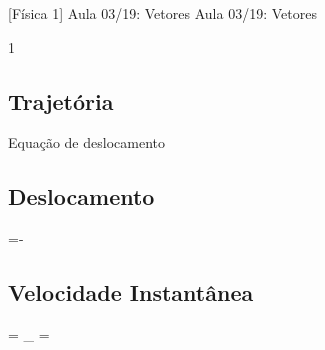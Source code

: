 \documentclass[\mainfilename]{subfiles}
\begin{document}

[Física 1]
{Aula 03/19: Vetores} %
{Aula 03/19: Vetores} %

\begin{sectionBox}1{} %

    \subsection{Trajetória}
    Equação de deslocamento

    \subsection{Deslocamento}
    \begin{BM}
        =-
    \end{BM}

    \subsection{Velocidade Instantânea}
    \begin{BM}
        = \lim_{}{}
        = 
    \end{BM}

\end{sectionBox}
\end{document}
